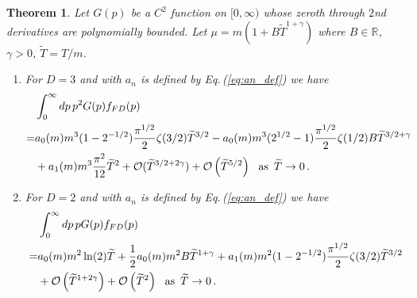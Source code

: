 \documentclass[sn-mathphys,Numbered]{sn-jnl}
\newcommand{\req}[1]{Eq.\,(\ref{#1})}
\newtheorem{theorem}{Theorem}
\begin{document}
\begin{theorem}\label{thm:mu_zero_faster}
Let $G(p)$ be a $C^2$ function on $[0,\infty)$ whose zeroth through $2$nd derivatives are polynomially bounded. Let $\mu=m(1+B\widetilde{T}^{1+\gamma})$ where $B\in\mathbb{R}$, $\gamma>0$, $\widetilde{T}=T/m$. 
\begin{enumerate}
 \item For $D=3$ and with $a_n$ is defined by \req{eq:an_def} we have
\begin{align}
&\int_0^\infty dp\, p^{2} G(p) f_{FD}(p)\label{eq:FD_b_decay_orig_integral}\\
 =& a_0(m)m^{3}(1 - 2^{-1/2}) \frac{\pi^{1/2}}{2} \zeta(3/2)\widetilde{T}^{3/2}- a_0(m)m^{3}({2}^{1/2}-1)\frac{\pi^{1/2}}{2}\zeta(1/2)B\widetilde{T}^{3/2+\gamma}\notag\\
 &+a_1(m)m^{3} \frac{\pi^2}{12}\widetilde{T}^{2}+\mathcal{O}(\widetilde{T}^{3/2+2\gamma})+\mathcal{O}\left(\widetilde{T}^{5/2}\right) \,\,\,\,\text{as}\,\,\, \widetilde{T}\to 0\,.\label{eq:asymp_FD_int_b_decay}
\end{align} 
\item For $D=2$ and with $a_n$ is defined by \req{eq:an_def} we have
\begin{align}
&\int_0^\infty dp\, p G(p) f_{FD}(p)\\
 =& a_0(m)m^{2}\ln(2)\widetilde{T}+\frac{1}{2}a_0(m)m^{2}B\widetilde{T}^{1+\gamma}+a_1(m)m^{2}(1 - 2^{-1/2}) \frac{\pi^{1/2}}{2} \zeta(3/2)\widetilde{T}^{3/2}\notag\\
 &+\mathcal{O}\left(\widetilde{T}^{1+2\gamma}\right)+\mathcal{O}\left(\widetilde{T}^{2}\right) \,\,\,\,\text{as}\,\, \,\widetilde{T}\to 0\,.\label{eq:asymp_FD_int_b_decay_D2}
\end{align}
\end{enumerate}

\end{theorem}
\end{document}
